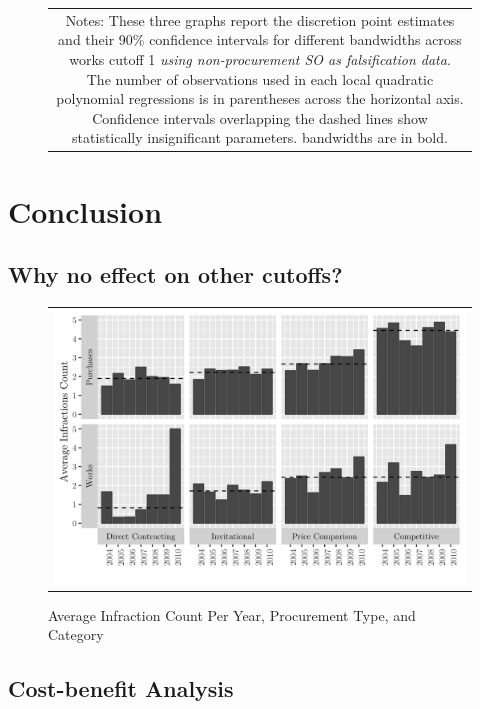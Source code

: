 \documentclass[11pt]{article}
\begin{document}
\begin{figure}[!htbp]
\begin{tabular}{c}
  \multicolumn{1}{p{.67\textwidth}}{\scriptsize Notes: These three graphs report the discretion point estimates and their 90\% confidence intervals for different bandwidths across works cutoff 1 \emph{using non-procurement SO as falsification data}. The number of observations used in each local quadratic polynomial regressions is in parentheses across the horizontal axis. Confidence intervals overlapping the dashed lines show statistically insignificant parameters. \citet{CattaneoInterpretingRegressionDiscontinuity2016,CattaneoAnalysisRegressionDiscontinuity2018} bandwidths are in bold.}
  \end{tabular}
\end{figure}

\section{Conclusion} \label{sec:conclusion}

\subsection{Why no effect on other cutoffs?} \label{subsec:whynoeffect}

\begin{figure}[!htbp]
  \caption{Average Infraction Count Per Year, Procurement Type, and Category}
  \label{fig:01discussion}
  \centering
  \small
  \begin{tabular}{c}
  \includegraphics[scale = .2]{01discussionplot}
  \end{tabular}
\end{figure}

\subsection{Cost-benefit Analysis} \label{subsec:cba}
\end{document}

